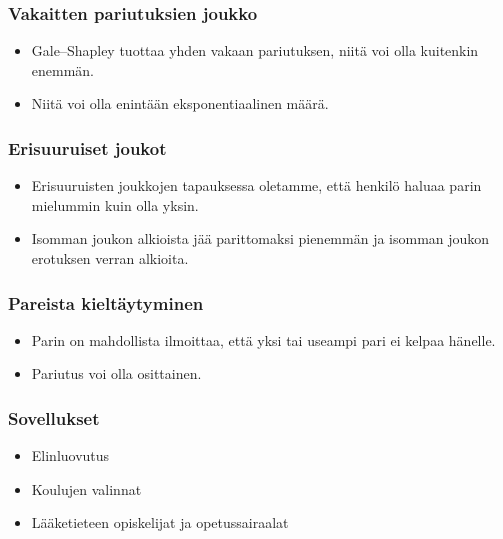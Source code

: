 \documentclass[table]{beamer}
\begin{document}
  \begin{frame}
  	\frametitle{Vakaitten pariutuksien joukko}
  	\fontsize{14pt}{7.2}\selectfont
  	\begin{itemize}
  		\item Gale--Shapley tuottaa yhden vakaan pariutuksen, niitä voi olla kuitenkin enemmän.
  		\item Niitä voi olla enintään eksponentiaalinen määrä.
  	\end{itemize}
  \end{frame}
  \begin{frame}
  	\frametitle{Erisuuruiset joukot}
  	\fontsize{14pt}{7.2}\selectfont
  	\begin{itemize}
  		\item Erisuuruisten joukkojen tapauksessa oletamme, että henkilö haluaa parin mielummin kuin olla yksin.
  		\item Isomman joukon alkioista jää parittomaksi pienemmän ja isomman joukon erotuksen verran alkioita.	
  	\end{itemize}
  \end{frame}
  \begin{frame}
  	\frametitle{Pareista kieltäytyminen}
  	\fontsize{16pt}{7.2}\selectfont
  	\begin{itemize}
  		\item Parin on mahdollista ilmoittaa, että yksi tai useampi pari ei kelpaa hänelle.
  		\item Pariutus voi olla osittainen.
  	\end{itemize}
  \end{frame}
  \begin{frame}
  	\frametitle{Sovellukset}
  	\fontsize{16pt}{7.2}\selectfont
  	\begin{itemize}
  		\item Elinluovutus
  		\item Koulujen valinnat
  		\item Lääketieteen opiskelijat ja opetussairaalat
  	\end{itemize}
  \end{frame}
\end{document}
